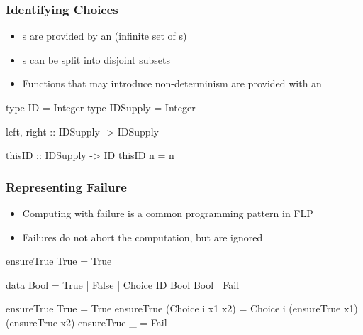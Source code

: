 \documentclass[%
,hyperref={pdfpagelabels=false}
,utf8
]{beamer}
\begin{document}
\begin{frame}[fragile]%
\frametitle{Identifying Choices}
\begin{itemize}
 \item {}s are provided by an 
       (infinite set of s)
 \item {}s can be split into disjoint subsets
 \item Functions that may introduce non-determinism
       are provided with an 
\end{itemize}
\pause

\begin{haskell} 
type ID = Integer
type IDSupply = Integer

left, right :: IDSupply -> IDSupply

thisID :: IDSupply -> ID
thisID n = n
\end{haskell}
\end{frame}

\begin{frame}[fragile]%
\frametitle{Representing Failure}
\begin{itemize}
 \item Computing with failure is a common programming pattern in FLP
 \item Failures do not abort the computation, but are ignored
\end{itemize}

\begin{curry}
ensureTrue True = True
\end{curry}

\begin{haskell}
data Bool = True | False | Choice ID Bool Bool \alert{| Fail}

ensureTrue True             = True
ensureTrue (Choice i x1 x2) = Choice i (ensureTrue x1)
                                       (ensureTrue x2)
\alert{ensureTrue _                = Fail}
\end{haskell}
\end{frame}
\end{document}
